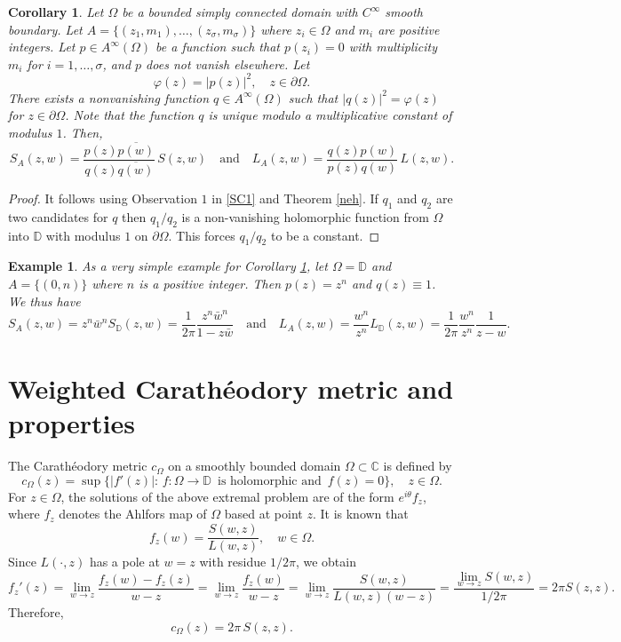\documentclass[11pt, reqno]{amsart}
\newtheorem{cor}[thm]{Corollary}
\newtheorem{exam}[thm]{Example}
\numberwithin{equation}{section}
\newcommand{\Om}{\Omega}
\begin{document}
\begin{cor}\label{SC2}
	Let $\Om$ be a bounded simply connected domain with $C^{\infty}$ smooth boundary. Let $A=\{(z_1,m_1),\ldots,(z_{\sigma},m_{\sigma})\}$ where $z_i\in\Om$ and $m_i$ are positive integers. Let $p\in A^{\infty}(\Om)$ be a function such that $p(z_i) = 0$ with multiplicity $m_i$ for $i=1,\ldots,\sigma$, and $p$ does not vanish elsewhere. Let 
	\[
	\varphi(z) = \vert p(z)\vert^2, \quad z\in\partial\Om.
	\]
	There exists a nonvanishing function $q\in A^{\infty}(\Om)$ such that $\vert q(z)\vert^2 = \varphi(z)$ for $z\in\partial\Om$. Note that the function $q$ is unique modulo a multiplicative constant of modulus $1$. Then,
	\begin{equation}
	S_A(z,w) = \frac{p(z) \overline{p(w)}}{q(z)\overline{q(w)}} \,S(z,w)
	\quad
	\text{and}
	\quad
	L_A(z,w) = \frac{q(z)p(w)}{p(z)q(w)} \,L(z,w).
	\end{equation}
\end{cor}
\begin{proof}
	It follows using Observation $1$ in \ref{SC1} and Theorem \ref{neh}. If $q_1$ and $q_2$ are two candidates for $q$ then $q_1/q_2$ is a non-vanishing holomorphic function from $\Om$ into $\mathbb{D}$ with modulus $1$ on $\partial\Om$. This forces $q_1/q_2$ to be a constant.
\end{proof}

\begin{exam}
	As a very simple example for Corollary \ref{SC2}, let $\Om = \mathbb{D}$ and $A=\{(0, n)\}$ where $n$ is a positive integer. Then $p(z) = z^n$ and $q(z) \equiv 1$. We thus have
	\[
	S_A(z,w) = z^n \bar{w}^n S_{\mathbb{D}}(z,w) = \frac{1}{2\pi} \frac{z^n\bar{w}^n}{1-z\bar{w}}
	\quad
	\text{and}
	\quad
	L_{A}(z,w) = \frac{w^n}{z^n} L_{\mathbb{D}}(z,w) = \frac{1}{2\pi} \frac{w^n}{z^n} \frac{1}{z-w}.
	\]
\end{exam}


	
	
	\section{Weighted Carath\'eodory metric and properties}
	
	The Carathéodory metric $c_{\Om}$ on a smoothly bounded domain $\Om\subset\mathbb{C}$ is defined by
	\begin{equation}
	c_{\Om}(z)=\sup\{\vert f'(z)\vert:\, f:\Om\rightarrow\mathbb{D}\,\text{ is holomorphic and }\,f(z)=0\},\quad z\in \Om.
	\end{equation}
	For $z\in \Om$, the solutions of the above extremal problem are of the form $e^{i\theta} f_z$, where $f_z$ denotes the Ahlfors map of $\Om$ based at point $z$. It is known that
	\[
	f_z(w)=\frac{S(w,z)}{L(w,z)},\quad w\in \Om.
	\]
	Since $L(\cdot,z)$ has a pole at $w=z$ with residue $1/2\pi$, we obtain
	\[
	{f_z}'(z)=\lim_{w\rightarrow z}\frac{f_z(w)-f_z(z)}{w-z}=\lim_{w\rightarrow z}\frac{f_z(w)}{w-z}=\lim_{w\rightarrow z}\frac{S(w,z)}{L(w,z) (w-z)}=\frac{\lim_{w\rightarrow z} S(w,z)}{1/2\pi}=2\pi S(z,z).
	\]
	Therefore, 
	\begin{equation}
	c_{\Om}(z)=2\pi\, S(z,z).
	\end{equation}
	
\end{document}
